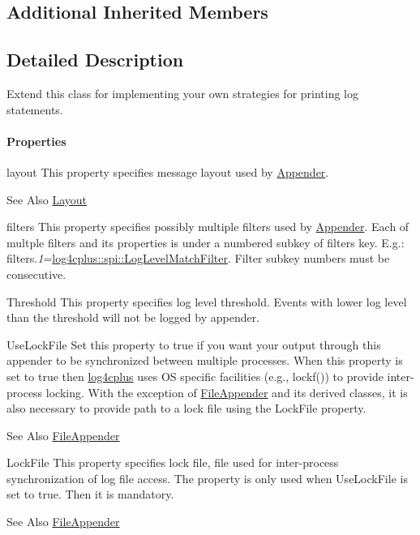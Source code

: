 \subsection*{Additional Inherited Members}


\subsection{Detailed Description}
Extend this class for implementing your own strategies for printing log statements.

\paragraph*{Properties}


\begin{DoxyDescription}
\item[{\ttfamily layout} ]This property specifies message layout used by \hyperlink{classlog4cplus_1_1Appender}{Appender}. \begin{DoxySeeAlso}{See Also}
\hyperlink{classlog4cplus_1_1Layout}{Layout} 
\end{DoxySeeAlso}

\item[{\ttfamily filters} ]This property specifies possibly multiple filters used by \hyperlink{classlog4cplus_1_1Appender}{Appender}. Each of multple filters and its properties is under a numbered subkey of filters key. E.\-g.\-: {\ttfamily filters.{\itshape 1}=\hyperlink{classlog4cplus_1_1spi_1_1LogLevelMatchFilter}{log4cplus\-::spi\-::\-Log\-Level\-Match\-Filter}}. Filter subkey numbers must be consecutive.


\item[{\ttfamily Threshold} ]This property specifies log level threshold. Events with lower log level than the threshold will not be logged by appender.


\item[{\ttfamily Use\-Lock\-File} ]Set this property to {\ttfamily true} if you want your output through this appender to be synchronized between multiple processes. When this property is set to true then \hyperlink{namespacelog4cplus}{log4cplus} uses O\-S specific facilities (e.\-g., {\ttfamily lockf()}) to provide inter-\/process locking. With the exception of \hyperlink{classlog4cplus_1_1FileAppender}{File\-Appender} and its derived classes, it is also necessary to provide path to a lock file using the {\ttfamily Lock\-File} property. \begin{DoxySeeAlso}{See Also}
\hyperlink{classlog4cplus_1_1FileAppender}{File\-Appender} 
\end{DoxySeeAlso}

\item[{\ttfamily Lock\-File} ]This property specifies lock file, file used for inter-\/process synchronization of log file access. The property is only used when {\ttfamily Use\-Lock\-File} is set to true. Then it is mandatory. \begin{DoxySeeAlso}{See Also}
\hyperlink{classlog4cplus_1_1FileAppender}{File\-Appender}  
\end{DoxySeeAlso}

\end{DoxyDescription}

